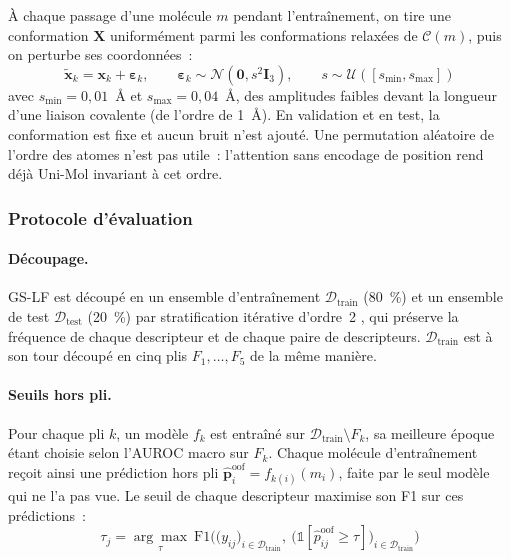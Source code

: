 À chaque passage d'une molécule $m$ pendant l'entraînement, on tire une conformation $\mathbf{X}$ uniformément parmi les conformations relaxées de $\mathcal{C}(m)$, puis on perturbe ses coordonnées~:
\begin{equation}
   \label{eq:Jitter}
   \tilde{\mathbf{x}}_k = \mathbf{x}_k + \boldsymbol{\varepsilon}_k,
   \qquad
   \boldsymbol{\varepsilon}_k \sim \mathcal{N}(\mathbf{0}, s^2 \mathbf{I}_3),
   \qquad
   s \sim \mathcal{U}([s_{\min}, s_{\max}])
\end{equation}
avec $s_{\min} = 0{,}01$~\AA{} et $s_{\max} = 0{,}04$~\AA, des amplitudes faibles devant la longueur d'une liaison covalente (de l'ordre de 1~\AA).
En validation et en test, la conformation est fixe et aucun bruit n'est ajouté.
Une permutation aléatoire de l'ordre des atomes n'est pas utile~: l'attention sans encodage de position rend déjà Uni-Mol invariant à cet ordre.

\subsubsection{Protocole d'évaluation}

\paragraph{Découpage.}
GS-LF est découpé en un ensemble d'entraînement $\mathcal{D}_{\mathrm{train}}$ (80~\%) et un ensemble de test $\mathcal{D}_{\mathrm{test}}$ (20~\%) par stratification itérative d'ordre~2 \cite{Sechidis-2011, Szymanski-2017}, qui préserve la fréquence de chaque descripteur et de chaque paire de descripteurs.
$\mathcal{D}_{\mathrm{train}}$ est à son tour découpé en cinq plis $F_1, \ldots, F_5$ de la même manière.

\paragraph{Seuils hors pli.}
Pour chaque pli $k$, un modèle $f_k$ est entraîné sur $\mathcal{D}_{\mathrm{train}} \setminus F_k$, sa meilleure époque étant choisie selon l'AUROC macro sur $F_k$.
Chaque molécule d'entraînement reçoit ainsi une prédiction hors pli $\hat{\mathbf{p}}^{\mathrm{oof}}_i = f_{k(i)}(m_i)$, faite par le seul modèle qui ne l'a pas vue.
Le seuil de chaque descripteur maximise son F1 sur ces prédictions~:
\begin{equation}
   \label{eq:Seuils}
   \tau_j = \underset{\tau}{\arg\max} \ \mathrm{F1}\Big( \big(y_{ij}\big)_{i \in \mathcal{D}_{\mathrm{train}}},\ \big(\mathbb{1}[\hat{p}^{\mathrm{oof}}_{ij} \geq \tau]\big)_{i \in \mathcal{D}_{\mathrm{train}}} \Big)
\end{equation}

